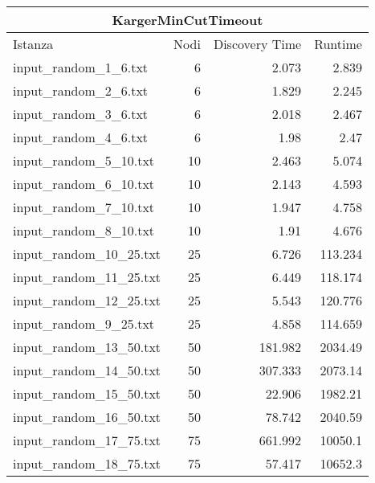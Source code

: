 \begin{table}[H]
    \centering

    \begin{tabular}{lrrr}
     \hline
     \multicolumn{4}{c}{KargerMinCutTimeout} \\
     \hline
     Istanza                    &   Nodi &   Discovery Time  &        Runtime \\
     \hline
     input\_random\_1\_6.txt    &       6 &            2.073 &          2.839 \\
     input\_random\_2\_6.txt    &       6 &            1.829 &          2.245 \\
     input\_random\_3\_6.txt    &       6 &            2.018 &          2.467 \\
     input\_random\_4\_6.txt    &       6 &            1.98  &          2.47  \\
     input\_random\_5\_10.txt   &      10 &            2.463 &          5.074 \\
     input\_random\_6\_10.txt   &      10 &            2.143 &          4.593 \\
     input\_random\_7\_10.txt   &      10 &            1.947 &          4.758 \\
     input\_random\_8\_10.txt   &      10 &            1.91  &          4.676 \\
     input\_random\_10\_25.txt  &      25 &            6.726 &        113.234 \\
     input\_random\_11\_25.txt  &      25 &            6.449 &        118.174 \\
     input\_random\_12\_25.txt  &      25 &            5.543 &        120.776 \\
     input\_random\_9\_25.txt   &      25 &            4.858 &        114.659 \\
     input\_random\_13\_50.txt  &      50 &          181.982 &       2034.49  \\
     input\_random\_14\_50.txt  &      50 &          307.333 &       2073.14  \\
     input\_random\_15\_50.txt  &      50 &           22.906 &       1982.21  \\
     input\_random\_16\_50.txt  &      50 &           78.742 &       2040.59  \\
     input\_random\_17\_75.txt  &      75 &          661.992 &      10050.1   \\
     input\_random\_18\_75.txt  &      75 &           57.417 &      10652.3   \\

\end{tabular}
\end{table}
